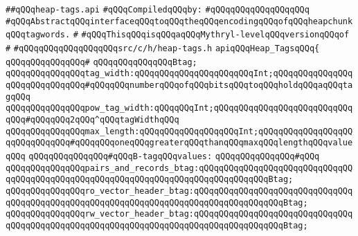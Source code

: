 \label{src/lib/compiler/back/low/main/main/heap-tags.api}
\verb|##qQQqheap-tags.api|\newline
\newline
\verb|#qQQqCompiledqQQqby:|\newline
\verb|#qQQqqQQqqQQqqQQqqQQq|\newline
\newline
\newline
\newline
\verb|#qQQqAbstractqQQqinterfaceqQQqtoqQQqtheqQQqencodingqQQqofqQQqheapchunkqQQqtagwords.|\newline
\verb|#|\newline
\verb|#qQQqThisqQQqisqQQqaqQQqMythryl-levelqQQqversionqQQqof|\newline
\verb|#|\newline
\verb|#qQQqqQQqqQQqqQQqqQQqsrc/c/h/heap-tags.h|\newline
\newline
\verb|apiqQQqHeap_TagsqQQq{|\newline
\verb|qQQqqQQqqQQqqQQq#|\newline
\verb|qQQqqQQqqQQqqQQqBtag;|\newline
\newline
\verb|qQQqqQQqqQQqqQQqtag_width:qQQqqQQqqQQqqQQqqQQqqQQqInt;qQQqqQQqqQQqqQQqqQQqqQQqqQQqqQQq#qQQqqQQqnumberqQQqofqQQqbitsqQQqtoqQQqholdqQQqaqQQqtagqQQq|\newline
\verb|qQQqqQQqqQQqqQQqpow_tag_width:qQQqqQQqInt;qQQqqQQqqQQqqQQqqQQqqQQqqQQqqQQq#qQQqqQQq2qQQq^qQQqtagWidthqQQq|\newline
\verb|qQQqqQQqqQQqqQQqmax_length:qQQqqQQqqQQqqQQqqQQqInt;qQQqqQQqqQQqqQQqqQQqqQQqqQQqqQQq#qQQqqQQqoneqQQqgreaterqQQqthanqQQqmaxqQQqlengthqQQqvalueqQQq|\newline
\newline
\verb|qQQqqQQqqQQqqQQq#qQQqB-tagqQQqvalues:|\newline
\verb|qQQqqQQqqQQqqQQq#qQQq|\newline
\verb|qQQqqQQqqQQqqQQqpairs_and_records_btag:qQQqqQQqqQQqqQQqqQQqqQQqqQQqqQQqqQQqqQQqqQQqqQQqqQQqqQQqqQQqqQQqqQQqqQQqqQQqqQQqqQQqBtag;|\newline
\verb|qQQqqQQqqQQqqQQqro_vector_header_btag:qQQqqQQqqQQqqQQqqQQqqQQqqQQqqQQqqQQqqQQqqQQqqQQqqQQqqQQqqQQqqQQqqQQqqQQqqQQqqQQqqQQqqQQqBtag;|\newline
\verb|qQQqqQQqqQQqqQQqrw_vector_header_btag:qQQqqQQqqQQqqQQqqQQqqQQqqQQqqQQqqQQqqQQqqQQqqQQqqQQqqQQqqQQqqQQqqQQqqQQqqQQqqQQqqQQqqQQqBtag;|\newline
